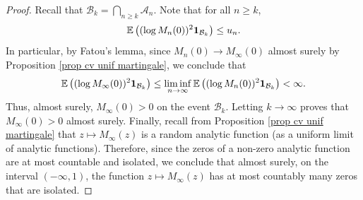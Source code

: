 \documentclass[10pt,a4paper]{amsart}
\def\E{\mathbb{E}}
\begin{document}
\begin{proof}
	Recall that $\mathcal{B}_k = \bigcap_{n\ge k} \mathcal{A}_n$. Note that for all $n\ge k$,
	\[
	\E\left((\log M_n(0))^2 {\bf 1}_{\mathcal{B}_k} \right)\le u_n.
	\]
	In particular, by Fatou's lemma, since $M_n(0)\to M_\infty(0)$ almost surely by Proposition \ref{prop cv unif martingale}, we conclude that
	\[
	\E\left((\log M_\infty(0))^2  {\bf 1}_{\mathcal{B}_k} \right) \le \liminf_{n\to \infty}\E\left((\log M_n(0))^2 {\bf 1}_{\mathcal{B}_k} \right) <\infty. 
	\]
	Thus, almost surely, $M_\infty(0) >0$ on the event $\mathcal{B}_k$. Letting $k\to \infty$ proves that $M_\infty(0)>0$ almost surely. Finally, recall from Proposition \ref{prop cv unif martingale} that $z\mapsto M_\infty(z)$ is a random analytic function (as a uniform limit of analytic functions). Therefore, since the zeros of a non-zero analytic function are at most countable and isolated, we conclude that almost surely, on the interval $(-\infty, 1)$, the function $z\mapsto M_\infty(z)$ has at most countably many zeros that are isolated.
\end{proof}
\end{document}
